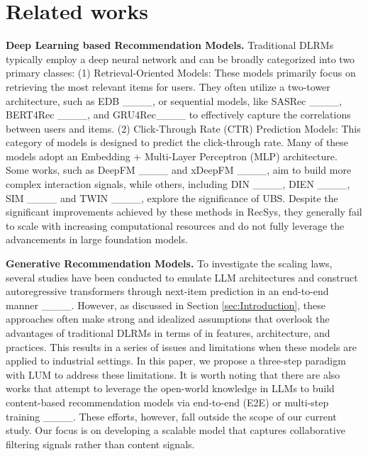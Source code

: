 \section{Related works}
\label{sec:Related works}
\noindent \textbf{Deep Learning based Recommendation Models.}
Traditional DLRMs typically employ a deep neural network and can be broadly categorized into two primary classes:
(1) Retrieval-Oriented Models: These models primarily focus on retrieving the most relevant items for users. 
They often utilize a two-tower architecture, such as EDB ____, or sequential models, like SASRec ____, BERT4Rec ____, and GRU4Rec____ to effectively capture the correlations between users and items.
(2)
Click-Through Rate (CTR) Prediction Models: This category of models is designed to predict the click-through rate. 
Many of these models adopt an Embedding + Multi-Layer Perceptron (MLP) architecture. 
Some works, such as DeepFM ____ and xDeepFM ____, aim to build more complex interaction signals, while others, including DIN ____, DIEN ____, SIM ____ and TWIN ____, explore the significance of UBS.
Despite the significant improvements achieved by these methods in RecSys, they generally fail to scale with increasing computational resources and do not fully leverage the advancements in large foundation models.


\noindent \textbf{Generative Recommendation Models.}
To investigate the scaling laws, several studies have been conducted to emulate LLM architectures and construct autoregressive transformers through next-item prediction in an end-to-end manner ____. 
However, as discussed in Section \ref{sec:Introduction}, these approaches often make strong and idealized assumptions that overlook the advantages of traditional DLRMs in terms of in features, architecture, and practices. 
This results in a series of issues and limitations when these models are applied to industrial settings.
In this paper, we propose a three-step paradigm with LUM to address these limitations. 
It is worth noting that there are also works that attempt to leverage the open-world knowledge in LLMs to build content-based recommendation models via end-to-end (E2E) or multi-step training ____. These efforts, however, fall outside the scope of our current study. 
Our focus is on developing a scalable model that captures collaborative filtering signals rather than content signals.

\vspace{-1em}